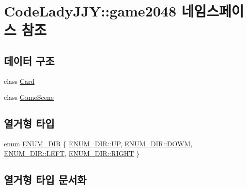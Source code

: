 \hypertarget{namespace_code_lady_j_j_y_1_1game2048}{}\section{Code\+Lady\+J\+JY\+:\+:game2048 네임스페이스 참조}
\label{namespace_code_lady_j_j_y_1_1game2048}
\subsection*{데이터 구조}
\begin{DoxyCompactItemize}
\item 
class \hyperlink{class_code_lady_j_j_y_1_1game2048_1_1_card}{Card}
\item 
class \hyperlink{class_code_lady_j_j_y_1_1game2048_1_1_game_scene}{Game\+Scene}
\end{DoxyCompactItemize}
\subsection*{열거형 타입}
\begin{DoxyCompactItemize}
\item 
enum \hyperlink{namespace_code_lady_j_j_y_1_1game2048_a5ce81ccb99ee47dcef151e7f8c9da08f}{E\+N\+U\+M\+\_\+\+D\+IR} \{ \hyperlink{namespace_code_lady_j_j_y_1_1game2048_a5ce81ccb99ee47dcef151e7f8c9da08fafbaedde498cdead4f2780217646e9ba1}{E\+N\+U\+M\+\_\+\+D\+I\+R\+::\+UP}, 
\hyperlink{namespace_code_lady_j_j_y_1_1game2048_a5ce81ccb99ee47dcef151e7f8c9da08faa175ed5748a200aaf331a4284383e2cd}{E\+N\+U\+M\+\_\+\+D\+I\+R\+::\+D\+O\+WM}, 
\hyperlink{namespace_code_lady_j_j_y_1_1game2048_a5ce81ccb99ee47dcef151e7f8c9da08fa684d325a7303f52e64011467ff5c5758}{E\+N\+U\+M\+\_\+\+D\+I\+R\+::\+L\+E\+FT}, 
\hyperlink{namespace_code_lady_j_j_y_1_1game2048_a5ce81ccb99ee47dcef151e7f8c9da08fa21507b40c80068eda19865706fdc2403}{E\+N\+U\+M\+\_\+\+D\+I\+R\+::\+R\+I\+G\+HT}
 \}
\end{DoxyCompactItemize}


\subsection{열거형 타입 문서화}
\mbox{\label{namespace_code_lady_j_j_y_1_1game2048_a5ce81ccb99ee47dcef151e7f8c9da08f}} 
